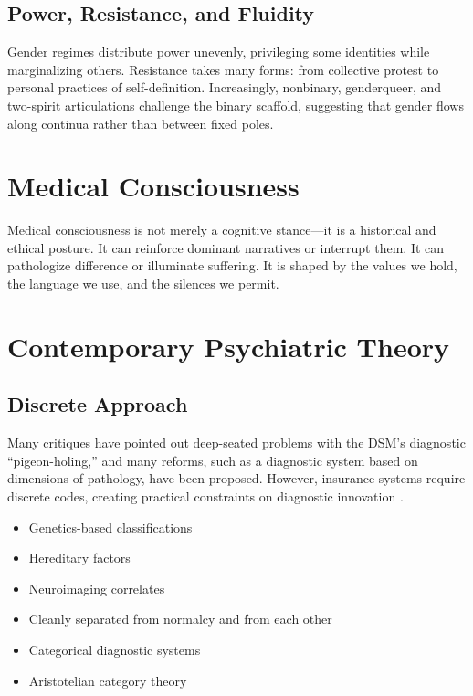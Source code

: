 \documentclass[a4paper]{article}
\begin{document}
\subsection{Power, Resistance, and Fluidity}
Gender regimes distribute power unevenly, privileging some identities while marginalizing others. 
Resistance takes many forms: from collective protest to personal practices of self-definition. 
Increasingly, nonbinary, genderqueer, and two-spirit articulations challenge the binary scaffold, suggesting that gender flows along continua rather than between fixed poles.

\section{Medical Consciousness}
Medical consciousness is not merely a cognitive stance—it is a historical and ethical posture.  
It can reinforce dominant narratives or interrupt them.  
It can pathologize difference or illuminate suffering.  
It is shaped by the values we hold, the language we use, and the silences we permit.


\section{Contemporary Psychiatric Theory}


\subsection{Discrete Approach}

Many critiques have pointed out deep-seated problems with the DSM's diagnostic \enquote{pigeon-holing,} and many reforms, such as a diagnostic system based on dimensions of pathology, have been proposed. However, insurance systems require discrete codes, creating practical constraints on diagnostic innovation \cite{PubMedObjective}.

\begin{itemize}[leftmargin=2em]
    \item Genetics-based classifications
    \item Hereditary factors
    \item Neuroimaging correlates
    \item Cleanly separated from normalcy and from each other
    \item Categorical diagnostic systems
    \item Aristotelian category theory
\end{itemize}
\end{document}
